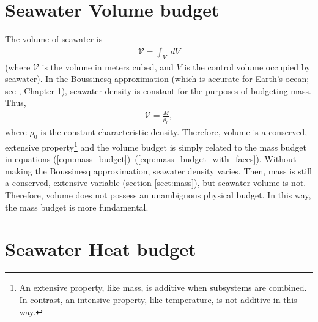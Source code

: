 \documentclass[10pt]{amsart}
\newcommand{\V}{{\mathcal V}}
\begin{document}
\section{Seawater Volume budget}
\label{sect:volume}

The volume of seawater is 
\begin{align}
\V  = \int_V \; dV 
\end{align}
(where $\V $ is the volume in meters cubed, and $V$ is the control volume occupied by seawater).
In the Boussinesq approximation (which is accurate for Earth's ocean; see \citealt{klinger&haine19}, Chapter 1), seawater density is constant for the purposes of budgeting mass.
Thus, 
\begin{align}
\V  = \frac{M}{\rho_0} ,
\end{align}
where $\rho_0$ is the constant characteristic density.
Therefore, volume is a conserved, extensive property\footnote{\label{fn:extensive} An extensive property, like mass, is additive when subsystems are combined. In contrast, an intensive property, like temperature, is not additive in this way.} and the volume budget is simply related to the mass budget in equations (\ref{eqn:mass_budget})--(\ref{eqn:mass_budget_with_faces}).
Without making the Boussinesq approximation, seawater density varies.
Then, mass is still a conserved, extensive variable (section \ref{sect:mass}), but seawater volume is not.
Therefore, volume does not possess an unambiguous physical budget.
In this way, the mass budget is more fundamental.

\section{Seawater Heat budget}
\label{sect:heat}
\end{document}
